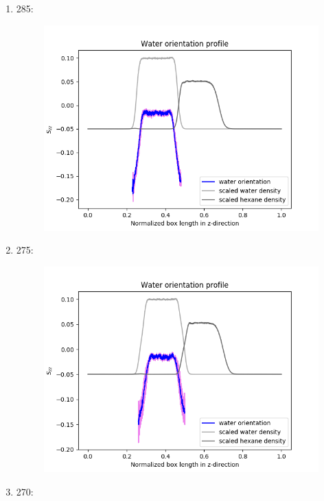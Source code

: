\documentclass[12pt,reqno]{amsart}
\numberwithin{equation}{section}
\begin{document}
\begin{enumerate}
\item 285:

\begin{figure}[H]
\centering
\includegraphics[scale=0.6]{full-285-1bead-water-orientation}
\end{figure}

\item 275:

\begin{figure}[H]
\centering
\includegraphics[scale=0.6]{full-275-1bead-water-orientation}
\end{figure}

\item 270:


\end{enumerate}
\end{document}
